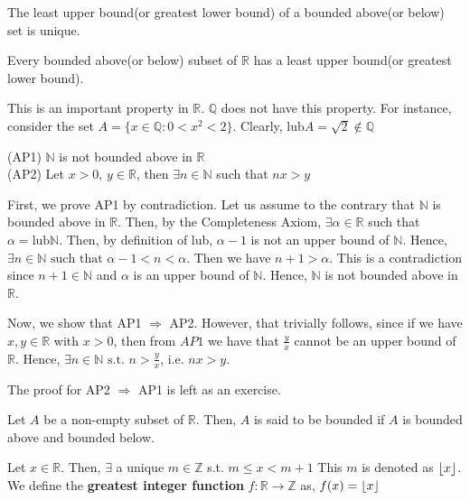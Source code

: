 \documentclass{scrartcl}
\newcommand{\rn}{\mathbb{R}}
\newcommand{\nn}{\mathbb{N}}
\newcommand{\q}{\mathbb{Q}}
\newcommand{\z}{\mathbb{Z}}
\newcommand{\lub}{\text{lub}}
\begin{document}
    \begin{theorem}
        The least upper bound(or greatest lower bound) of a bounded above(or below) set is unique.
    \end{theorem}
    \begin{definition}
        Every bounded above(or below) subset of $\rn$ has a least upper bound(or greatest lower bound).
    \end{definition}
    \begin{remark}    
        This is an important property in $\rn$. $\q$ does not have this property. For instance, consider 
        the set $A = \{ x\in \q : 0<x^2<2\}$. Clearly, $\text{lub}A = \sqrt{2} \notin \q$
    \end{remark}
    \begin{theorem}
        (AP1) $\nn$ is not bounded above in $\rn$ \\
        (AP2) Let $x>0$, $y \in \rn$, then $\exists n \in \nn$ such that $nx > y$
    \end{theorem}
        \begin{proof*}
            First, we prove AP1 by contradiction. Let us assume to the contrary that $\nn$ is bounded above
            in $\rn$. Then, by the Completeness Axiom, $\exists \alpha \in \rn$ such that $\alpha = \lub \nn$. Then, by definition of lub, 
            $\alpha -1$ is not an upper bound of $\nn$. Hence, $\exists n \in \nn \text{ such that } \alpha -1<n<\alpha$. Then 
            we have $n +1 > \alpha$. This is a contradiction since $n + 1 \in \nn$ and $\alpha$ is an upper bound of $\nn$. Hence, $\nn$ is not bounded above
            in $\rn$.

            Now, we show that AP1 $\Rightarrow$ AP2. However, that trivially follows, since if we have $x, y \in \rn$ with 
            $x > 0$, then from $AP1$ we have that $\frac{y}{x}$ cannot be an upper bound of $\rn$. Hence, 
            $\exists n \in \nn \text{ s.t. } n > \frac{y}{x}$, i.e. $nx > y$.

            The proof for AP2 $\Rightarrow$ AP1 is left as an exercise.
        \end{proof*}
    \begin{definition}
        Let $A$ be a non-empty subset of $\rn$. Then, $A$ is said to be bounded if $A$ is bounded above and bounded below.
    \end{definition}
    \begin{theorem}
        Let $x \in \rn$. Then, $\exists$ a unique $m \in \z$ s.t. $m \leq x < m+1$
        This $m$ is denoted as $\left\lfloor x \right\rfloor$. We define the \textbf{greatest integer function} $f : \rn \to \z$ as, $f(x) = \left\lfloor x \right\rfloor$
    \end{theorem}
\end{document}
